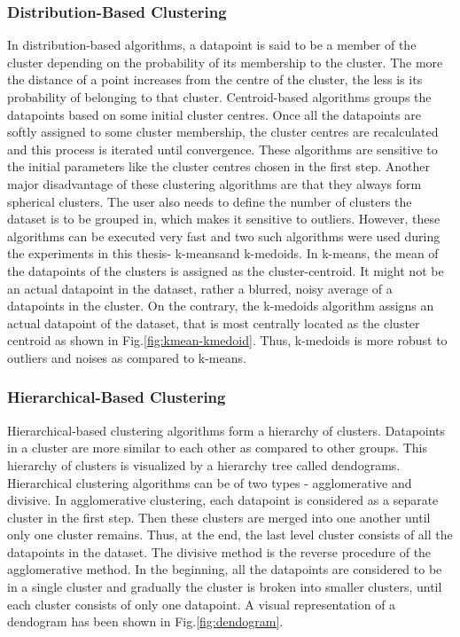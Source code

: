 \subsubsection{Distribution-Based Clustering}
\label{sec:Distribution_based_Clustering}
In distribution-based algorithms, a datapoint is said to be a member of the cluster depending on the probability of its membership to the cluster. The more the distance of a point increases from the centre of the cluster, the less is its probability of belonging to that cluster. Centroid-based algorithms groups the datapoints based on some initial cluster centres. Once all the datapoints are softly assigned to some cluster membership, the cluster centres are recalculated and this process is iterated until convergence. These algorithms are sensitive to the initial parameters like the cluster centres chosen in the first step. Another major disadvantage of these clustering algorithms are that they always form spherical clusters. The user also needs to define the number of clusters the dataset is to be grouped in, which makes it sensitive to outliers. However, these algorithms can be executed very fast and two such algorithms were used during the experiments in this thesis- k-means\cite{kmeans}and k-medoids\cite{kmedoids}. In k-means, the mean of the datapoints of the clusters is assigned as the cluster-centroid. It might not be an actual datapoint in the dataset, rather a blurred, noisy average of a datapoints in the cluster. On the contrary, the k-medoids algorithm assigns an actual datapoint of the dataset, that is most centrally located as the cluster centroid as shown in Fig.\ref{fig:kmean-kmedoid}. Thus, k-medoids is more robust to outliers and noises as compared to k-means.\cite{arora2016analysis}

\subsubsection{Hierarchical-Based Clustering}
Hierarchical-based clustering algorithms form a hierarchy of clusters. Datapoints in a cluster are more similar to each other as compared to other groups. This hierarchy of clusters is visualized by a hierarchy tree called dendograms. Hierarchical clustering algorithms can be of two types - agglomerative and divisive. In agglomerative clustering, each datapoint is considered as a separate cluster in the first step. Then these clusters are merged into one another until only one cluster remains. Thus, at the end, the last level cluster consists of all the datapoints in the dataset. The divisive method is the reverse procedure of the agglomerative method. In the beginning, all the datapoints are considered to be in a single cluster and gradually the cluster is broken into smaller clusters, until each cluster consists of only one datapoint. A visual representation of a dendogram has been shown in Fig.\ref{fig:dendogram}.\cite{murtagh2012algorithms}

